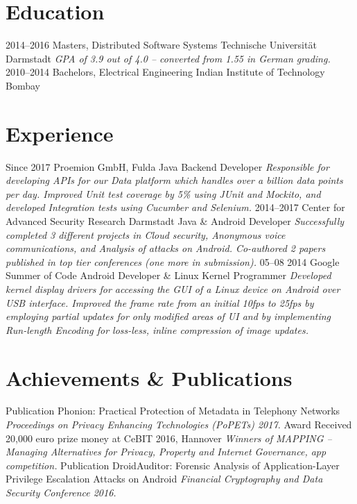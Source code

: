 \documentclass[]{friggeri-cv}
\begin{document}
\section{Education}
    \begin{entrylist}
        \entry
            {2014–2016}
            {Masters, {\normalfont Distributed Software Systems}}
            {Technische Universität Darmstadt}
            {\emph{GPA of 3.9 out of 4.0 -- converted from 1.55 in German grading.}}
        \entry
            {2010–2014}
            {Bachelors, {\normalfont Electrical Engineering}}
            {Indian Institute of Technology Bombay}
            {}%
    \end{entrylist}
    \vspace{-0.3cm}

\section{Experience}
    \begin{entrylist}
        \entry
            {Since 2017}
            {Proemion GmbH, Fulda}
            {Java Backend Developer}
            {\emph{Responsible for developing APIs for our Data platform which handles over a billion data points per day. Improved Unit test coverage by 5\% using JUnit and Mockito, and developed Integration tests using Cucumber and Selenium.}}
        \entry
            {2014–2017}
            {Center for Advanced Security Research Darmstadt}
            {Java \& Android Developer}
            {\emph{Successfully completed 3 different projects in Cloud security, Anonymous voice communications, and Analysis of attacks on Android. Co-authored 2 papers published in top tier conferences (one more in submission).}}
        \entry
            {05–08 2014}
            {Google Summer of Code}
            {Android Developer \& Linux Kernel Programmer}
            {\emph{Developed kernel display drivers for accessing the GUI of a Linux device on Android over USB interface. Improved the frame rate from an initial 10fps to 25fps by employing partial updates for only modified areas of UI and by implementing Run-length Encoding for loss-less, inline compression of image updates.}}
    \end{entrylist}

\section{Achievements \& Publications}
	\begin{entrylist}
        \entry
            {Publication}
            {Phonion: Practical Protection of Metadata in Telephony Networks}{}
            {\emph{Proceedings on Privacy Enhancing Technologies (PoPETs) 2017.}}
        \entry
            {Award}
            {Received 20,000 euro prize money at CeBIT 2016, Hannover}{}
            {\emph{Winners of MAPPING -- Managing Alternatives for Privacy, Property and Internet Governance, app competition.}}
        \entry
            {Publication}
            {DroidAuditor: Forensic Analysis of Application-Layer Privilege Escalation Attacks on Android}{}
            {\emph{Financial Cryptography and Data Security Conference 2016.}}        
	\end{entrylist}
\end{document}
